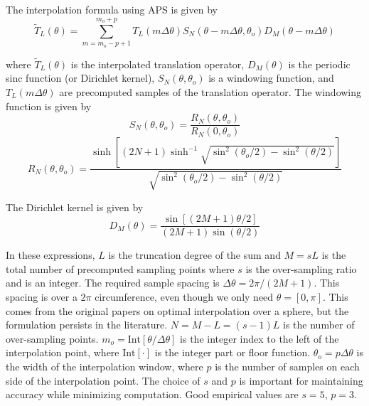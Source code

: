 The interpolation formula using APS is given by \cite{bucci1991optimal,yucel2008helmholtz}
\begin{equation}
\widetilde{T}_L(\theta) = \sum_{m = m_o - p + 1}^{m_o + p} T_L(m\Delta\theta)S_N(\theta-m\Delta\theta,\theta_o)D_M(\theta - m \Delta\theta)
\end{equation}

\noindent where $\widetilde{T}_L(\theta)$ is the interpolated translation operator, $D_M(\theta)$ is the periodic sinc function (or Dirichlet kernel), $S_N(\theta,\theta_o)$ is a windowing function, and $T_L(m\Delta\theta)$ are precomputed samples of the translation operator.  The windowing function is given by 
\begin{equation}
S_N(\theta,\theta_o) = \dfrac{R_N(\theta,\theta_o)}{R_N(0,\theta_o)} 
\end{equation}
\begin{equation}
R_N(\theta,\theta_o) = \dfrac{\sinh\left[ (2N+1) \sinh^{-1} \sqrt{\sin^2(\theta_o/2) - \sin^2(\theta/2)}\right]}{\sqrt{\sin^2(\theta_o/2) - \sin^2(\theta/2)}}
\end{equation}

The Dirichlet kernel is given by 
\begin{equation}
D_M(\theta) = \dfrac{\sin\left[(2M+1)\theta/2 \right]}{(2M+1)\sin(\theta/2)}
\end{equation}

In these expressions, $L$ is the truncation degree of the sum and $M=sL$ is the total number of precomputed sampling points where $s$ is the over-sampling ratio and is an integer.  The required sample spacing is $\Delta \theta = 2\pi/(2M+1)$.  This spacing is over a $2\pi$ circumference, even though we only need $\theta = [0, \pi]$.  This comes from the original papers on optimal interpolation over a sphere, but the formulation persists in the literature.  $N = M-L = (s-1)L$ is the number of over-sampling points.  $m_o = \textrm{Int}[\theta/\Delta\theta]$ is the integer index to the left of the interpolation point, where $\textrm{Int}[\cdot]$ is the integer part or floor function.   $\theta_o = p\Delta\theta$ is the width of the interpolation window, where $p$ is the number of samples on each side of the interpolation point.  The choice of $s$ and $p$ is important for maintaining accuracy while minimizing computation.  Good empirical values are $s = 5$, $p= 3$.  


